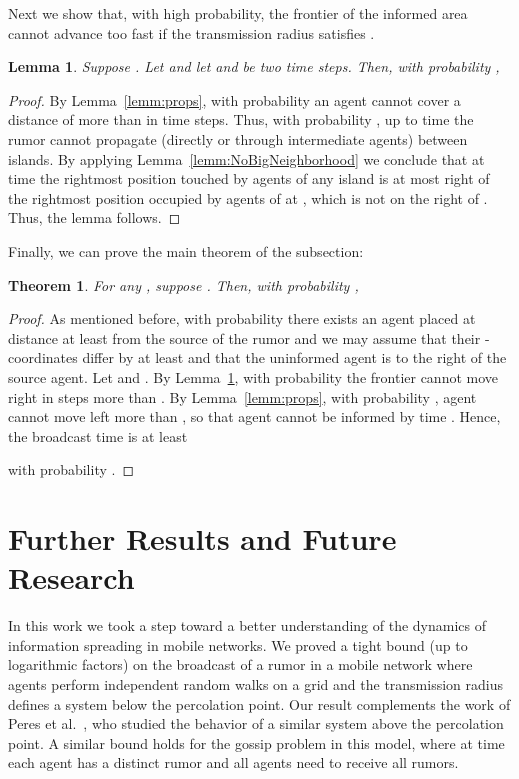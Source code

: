 \documentclass[11pt]{article}
\newtheorem{theo}{Theorem}
\newtheorem{lemm}{Lemma}
\begin{document}
Next we show that, with high probability,
the frontier of the informed area cannot advance too fast
if the transmission radius satisfies .
\begin{lemm}
\label{lemm:SlowFrontier}
Suppose .
Let  and let 
and  be two time steps.
Then, with probability ,

\end{lemm}
\begin{proof}
By Lemma~\ref{lemm:props}, with probability  an agent cannot
cover a distance of more than  in 
time steps.  Thus, with probability , up to time  the
rumor cannot propagate (directly or through intermediate agents)
between islands. By applying Lemma~\ref{lemm:NoBigNeighborhood} we
conclude that at time  the rightmost position touched by agents
of any island  is at most  right of the
rightmost position occupied by agents of  at , which is not on
the right of . Thus, the lemma follows.
\end{proof}

Finally, we can prove the main theorem of the subsection:
\begin{theo}
\label{theo:LBSpreadingTime2}
For any , suppose .
Then, with probability \sloppy ,

\end{theo}
\begin{proof}
As mentioned before, with probability 
there exists an agent  placed at
distance at least  from the source of the rumor and we may
assume that their -coordinates differ by at least  and
that the uninformed agent is to the right of the source agent.
Let  and
.
By Lemma~\ref{lemm:SlowFrontier}, with probability 
the frontier cannot move right in  steps more than
.
By Lemma~\ref{lemm:props}, with probability ,
agent  cannot move left more than ,
so that agent  cannot be informed by time .
Hence, the broadcast time is at least

with probability .
\end{proof}



\section{Further Results and Future Research}
\label{sec:conclusions}

In this work we took a step toward a better understanding of the
dynamics of information spreading in mobile networks.  We proved a
tight bound (up to logarithmic factors) on the broadcast of a rumor in
a mobile network where agents perform independent random walks on a
grid and the transmission radius defines a system below the
percolation point.  Our result complements the work of Peres et
al.~\cite{PeresSSS11}, who studied the behavior of a similar system
above the percolation point.  A similar bound holds for the gossip
problem in this model, where at time  each agent has a distinct
rumor and all agents need to receive all rumors.
\end{document}
